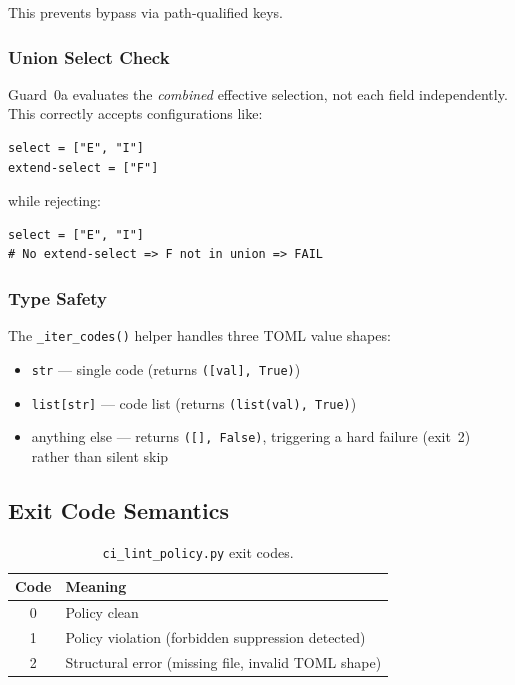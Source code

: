 \documentclass[11pt,a4paper]{article}
\begin{document}
This prevents bypass via path-qualified keys.

\subsubsection{Union Select Check}

Guard~0a evaluates the \emph{combined} effective selection, not each field
independently. This correctly accepts configurations like:

\begin{lstlisting}[style=tomlstyle]
select = ["E", "I"]
extend-select = ["F"]
\end{lstlisting}

\noindent while rejecting:

\begin{lstlisting}[style=tomlstyle]
select = ["E", "I"]
# No extend-select => F not in union => FAIL
\end{lstlisting}

\subsubsection{Type Safety}

The \texttt{\_iter\_codes()} helper handles three TOML value shapes:

\begin{itemize}
    \item \texttt{str} --- single code (returns \texttt{([val], True)})
    \item \texttt{list[str]} --- code list (returns \texttt{(list(val), True)})
    \item anything else --- returns \texttt{([], False)}, triggering a hard
          failure (exit~2) rather than silent skip
\end{itemize}

\subsection{Exit Code Semantics}

\begin{table}[H]
\centering
\caption{\texttt{ci\_lint\_policy.py} exit codes.}
\label{tab:exit}
\begin{tabular}{@{}cl@{}}
\toprule
\textbf{Code} & \textbf{Meaning} \\
\midrule
0 & Policy clean \\
1 & Policy violation (forbidden suppression detected) \\
2 & Structural error (missing file, invalid TOML shape) \\
\bottomrule
\end{tabular}
\end{table}
\end{document}
